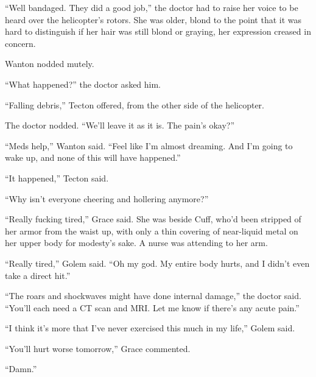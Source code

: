 





``Well bandaged.  They did a good job,'' the doctor had to raise her voice to be heard over the helicopter's rotors.  She was older, blond to the point that it was hard to distinguish if her hair was still blond or graying, her expression creased in concern.



Wanton nodded mutely.



``What happened?'' the doctor asked him.



``Falling debris,'' Tecton offered, from the other side of the helicopter.



The doctor nodded.  ``We'll leave it as it is.  The pain's okay?''



``Meds help,'' Wanton said.  ``Feel like I'm almost dreaming.  And I'm going to wake up, and none of this will have happened.''



``It happened,'' Tecton said.



``Why isn't everyone cheering and hollering anymore?''



``Really fucking tired,'' Grace said.  She was beside Cuff, who'd been stripped of her armor from the waist up, with only a thin covering of near-liquid metal on her upper body for modesty's sake.  A nurse was attending to her arm.



``Really tired,'' Golem said.  ``Oh my god.  My entire body hurts, and I didn't even take a direct hit.''



``The roars and shockwaves might have done internal damage,'' the doctor said.  ``You'll each need a CT scan and MRI.  Let me know if there's any acute pain.''



``I think it's more that I've never exercised this much in my life,'' Golem said.



``You'll hurt worse tomorrow,'' Grace commented.



``Damn.''




